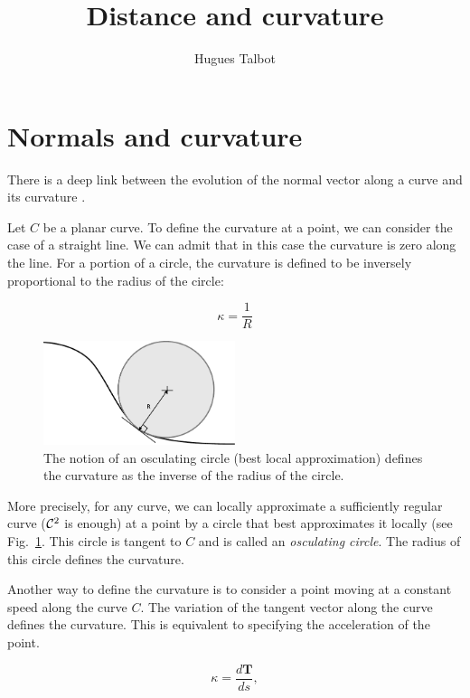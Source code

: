 \documentclass[11pt,a4paper]{article}
\title{Distance and curvature}
\author{Hugues Talbot}
\begin{document}
\maketitle
	
	
	\section{Normals and curvature}
	
	There is a deep link between the evolution of the normal vector along a curve and its curvature .
	
	Let $C$ be a planar curve. To define the curvature at a point, we can consider
	the case of a straight line. We can admit that in this case the curvature is zero along the line. For a portion of a circle, the curvature is defined to be inversely proportional to the radius of the circle:
	
	\begin{equation}
	\kappa = \frac{1}{R}
	\end{equation}
	
		\begin{figure}
			\centering
			\includegraphics[width=0.5\textwidth]{Drawings/Osculating.pdf}
			\caption{The notion of an osculating circle (best local approximation) defines the curvature as the inverse of the radius of the circle.\label{fig:oscul}}
		\end{figure}
	
	More precisely, for any curve, we can locally approximate a sufficiently regular curve (${\cal C}^2$ is enough) at a point by a circle that best approximates it locally (see Fig.~\ref{fig:oscul}. This circle is tangent to $C$ and is called an {\em osculating circle}. The radius of this circle defines the curvature.
	

	
	Another way to define the curvature is to consider a point moving at a constant speed along the curve $C$. The variation of the tangent vector along the curve defines the curvature. This is equivalent to specifying the acceleration of the point.
	
	
	\begin{equation}
	\kappa = \frac{d \mathbf{T}}{ds},
	\end{equation}
	
\end{document}
